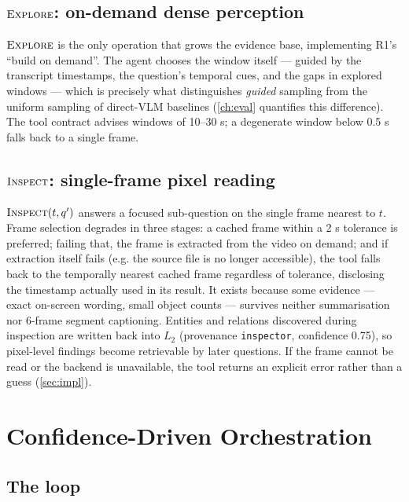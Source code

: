 \subsection{$\textsc{Explore}$: on-demand dense perception}
\label{subsec:explore}

$\textsc{Explore}$ is the only operation that grows the evidence base, implementing R1's ``build
on demand''. The agent chooses the window itself --- guided by the transcript timestamps, the
question's temporal cues, and the gaps in explored windows --- which is precisely what
distinguishes \emph{guided} sampling from the uniform sampling of direct-VLM baselines (\cref{ch:eval} quantifies
this difference). The tool contract advises windows of 10--30 s; a degenerate window below 0.5 s
falls back to a single frame.

\subsection{$\textsc{Inspect}$: single-frame pixel reading}
\label{subsec:inspect}

$\textsc{Inspect}(t, q')$ answers a focused sub-question on the single frame nearest to $t$.
Frame selection degrades in three stages: a cached frame within a 2 s tolerance is preferred;
failing that, the frame is extracted from the video on demand; and if extraction itself fails
(e.g. the source file is no longer accessible), the tool falls back to the temporally nearest
cached frame regardless of tolerance, disclosing the timestamp actually used in its result.
It exists because
some evidence --- exact on-screen wording, small object counts --- survives neither summarisation nor
6-frame segment captioning. Entities and relations discovered during inspection are written back
into $L_2$ (provenance \texttt{inspector}, confidence 0.75), so pixel-level findings become retrievable
by later questions. If the frame cannot be read or the backend is unavailable, the tool returns
an explicit error rather than a guess (\cref{sec:impl}).

\section{Confidence-Driven Orchestration}
\label{sec:orchestration}

\subsection{The loop}
\label{subsec:loop}


